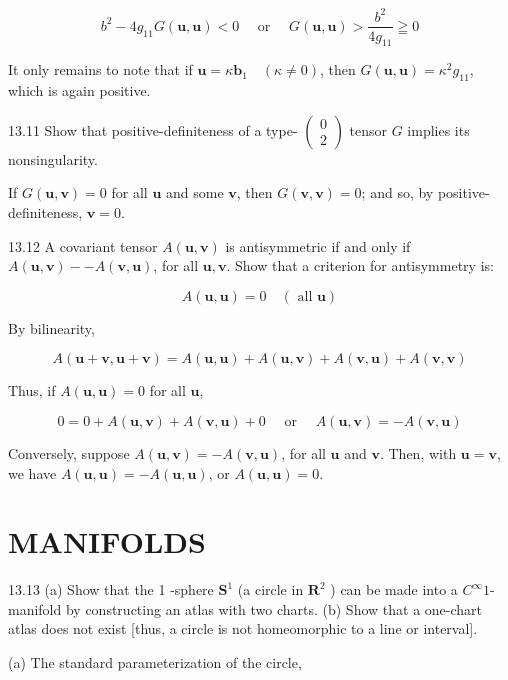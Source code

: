 \documentclass[10pt]{article}
\begin{document}
$$
b^{2}-4 g_{11} G(\mathbf{u}, \mathbf{u})<0 \quad \text { or } \quad G(\mathbf{u}, \mathbf{u})>\frac{b^{2}}{4 g_{11}} \geqq 0
$$

It only remains to note that if $\mathbf{u}=\kappa \mathbf{b}_{1} \quad(\kappa \neq 0)$, then $G(\mathbf{u}, \mathbf{u})=\kappa^{2} g_{11}$, which is again positive.

13.11 Show that positive-definiteness of a type- $\left(\begin{array}{l}0 \\ 2\end{array}\right)$ tensor $G$ implies its nonsingularity.

If $G(\mathbf{u}, \mathbf{v})=0$ for all $\mathbf{u}$ and some $\mathbf{v}$, then $G(\mathbf{v}, \mathbf{v})=0$; and so, by positive-definiteness, $\mathbf{v}=0$.

13.12 A covariant tensor $A(\mathbf{u}, \mathbf{v})$ is antisymmetric if and only if $A(\mathbf{u}, \mathbf{v})--A(\mathbf{v}, \mathbf{u})$, for all $\mathbf{u}, \mathbf{v}$. Show that a criterion for antisymmetry is:

$$
A(\mathbf{u}, \mathbf{u})=0 \quad(\text { all } \mathbf{u})
$$

By bilinearity,

$$
A(\mathbf{u}+\mathbf{v}, \mathbf{u}+\mathbf{v})=A(\mathbf{u}, \mathbf{u})+A(\mathbf{u}, \mathbf{v})+A(\mathbf{v}, \mathbf{u})+A(\mathbf{v}, \mathbf{v})
$$

Thus, if $A(\mathbf{u}, \mathbf{u})=0$ for all $\mathbf{u}$,

$$
0=0+A(\mathbf{u}, \mathbf{v})+A(\mathbf{v}, \mathbf{u})+0 \quad \text { or } \quad A(\mathbf{u}, \mathbf{v})=-A(\mathbf{v}, \mathbf{u})
$$

Conversely, suppose $A(\mathbf{u}, \mathbf{v})=-A(\mathbf{v}, \mathbf{u})$, for all $\mathbf{u}$ and $\mathbf{v}$. Then, with $\mathbf{u}=\mathbf{v}$, we have $A(\mathbf{u}, \mathbf{u})=-A(\mathbf{u}, \mathbf{u})$, or $A(\mathbf{u}, \mathbf{u})=0$.

\section*{MANIFOLDS}
13.13 (a) Show that the 1 -sphere $\mathbf{S}^{1}$ (a circle in $\mathbf{R}^{2}$ ) can be made into a $C^{\infty} 1$-manifold by constructing an atlas with two charts. (b) Show that a one-chart atlas does not exist [thus, a circle is not homeomorphic to a line or interval].

(a) The standard parameterization of the circle,
\end{document}
